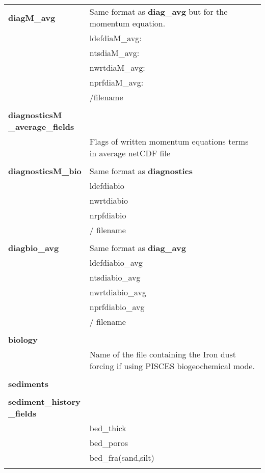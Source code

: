 \begin{longtable}{|p{0.25\linewidth}|p{0.75\linewidth}|}
\large{\textbf{diagM\_avg}} &  Same format as \large{\textbf{diag\_avg}} but for the momentum equation. \\
&ldefdiaM\_avg:     \\
&ntsdiaM\_avg:      \\
&nwrtdiaM\_avg:     \\
&nprfdiaM\_avg:     \\
&/filename          \\
&  \\ 

\large{\textbf{diagnosticsM \_average\_fields}} &     \\
& Flags of written momentum equations terms in average netCDF file\\
& \\


\large{\textbf{diagnosticsM\_bio}} & Same format as \large{\textbf{diagnostics}}     \\
&ldefdiabio   \\
&nwrtdiabio   \\
&nrpfdiabio   \\
&/ filename    \\
&  \\ 

\large{\textbf{diagbio\_avg}} & Same format as \large{\textbf{diag\_avg}}  \\
&ldefdiabio\_avg  \\
&ntsdiabio\_avg   \\
&nwrtdiabio\_avg  \\
&nprfdiabio\_avg  \\
&/ filename \\
&  \\ 

\large{\textbf{biology}} &     \\
& Name of the file containing the Iron dust forcing if using PISCES biogeochemical
mode. \\
&  \\ 

\large{\textbf{sediments}} &     \\
&  \\ 

\large{\textbf{sediment\_history \_fields}} &     \\
& bed\_thick  \\
& bed\_poros \\ 
& bed\_fra(sand,silt) \\
&  \\ 


\end{longtable}
